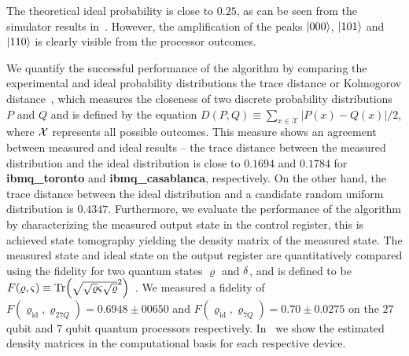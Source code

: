 
\noindent
The theoretical ideal probability is close to $0.25$, as can be seen from the simulator results in~. However, the amplification of the peaks $\ket{000}$, $\ket{101}$ and $\ket{110}$ is clearly visible from the processor outcomes. 

\bigskip
\noindent
We quantify the successful performance of the algorithm by comparing the experimental and ideal probability distributions \via the trace distance or Kolmogorov distance~\cite{Mike&Ike}, which measures the closeness of two discrete probability distributions $P$ and $Q$ and is defined by the equation $D(P,Q) \equiv \sum_{x \in \mathcal{X}}|P(x) - Q(x)|/2$, where ${\cal X}$ represents all possible outcomes. This measure shows an agreement between measured and ideal results -- the trace distance between the measured distribution and the ideal distribution is close to $0.1694$ and $0.1784$ for \textbf{ibmq\_toronto} and \textbf{ibmq\_casablanca}, respectively. On the other hand, the trace distance between the ideal distribution and a candidate random uniform distribution is $0.4347$. Furthermore, we evaluate the performance of the algorithm by characterizing the measured output state in the control register, this is achieved \via state tomography yielding the density matrix of the measured state. The measured state and ideal state on the output register are quantitatively compared using the fidelity for two quantum states $\varrho$ and $\var$, and is defined to be $F(\varrho, \varsigma) \equiv \Tr(\sqrt{\sqrt{\varrho}\varsigma\sqrt{\varrho}}^2)$~\cite{Mike&Ike}. We measured a fidelity of $F(\varrho_\text{id}, \varrho_{27Q})=0.6948 \pm 00650$ and $F(\varrho_\text{id}, \varrho_{7Q}) = 0.70 \pm 0.0275$ on the $27$ qubit and $7$ qubit quantum processors respectively. In~ we show the estimated density matrices in the computational basis for each respective device.

\clearpage

\begin{figure*}[t!]
    \centering
	 \\
\end{figure*}

